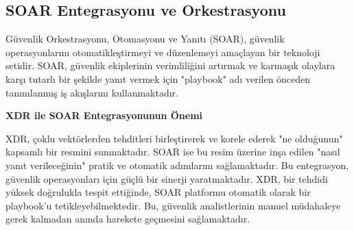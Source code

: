 \subsection{SOAR Entegrasyonu ve Orkestrasyonu}

Güvenlik Orkestrasyonu, Otomasyonu ve Yanıtı (SOAR), güvenlik operasyonlarını otomatikleştirmeyi ve düzenlemeyi amaçlayan bir teknoloji setidir. SOAR, güvenlik ekiplerinin verimliliğini artırmak ve karmaşık olaylara karşı tutarlı bir şekilde yanıt vermek için "playbook" adı verilen önceden tanımlanmış iş akışlarını kullanmaktadır.

\textbf{XDR ile SOAR Entegrasyonunun Önemi}

XDR, çoklu vektörlerden tehditleri birleştirerek ve korele ederek "ne olduğunun" kapsamlı bir resmini sunmaktadır. SOAR ise bu resim üzerine inşa edilen "nasıl yanıt verileceğinin" pratik ve otomatik adımlarını sağlamaktadır. Bu entegrasyon, güvenlik operasyonları için güçlü bir sinerji yaratmaktadır. XDR, bir tehdidi yüksek doğrulukla tespit ettiğinde, SOAR platformu otomatik olarak bir playbook'u tetikleyebilmektedir. Bu, güvenlik analistlerinin manuel müdahaleye gerek kalmadan anında harekete geçmesini sağlamaktadır.

